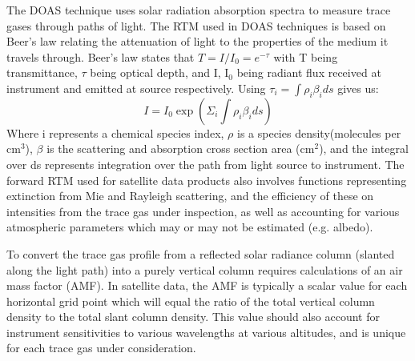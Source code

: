     The DOAS technique uses solar radiation absorption spectra to measure trace gases through paths of light.
    The RTM used in DOAS techniques is based on Beer's law relating the attenuation of light to the properties of the medium it travels through.
    Beer's law states that $ T = I/I_0 = e^{-\tau} $ with T being transmittance, $\tau$ being optical depth, and I, I$_0$ being radiant flux received at instrument and emitted at source respectively.
    Using 
    $ \tau_i = \int \rho_i \beta_i ds $ gives us:
    $$ I = I_0 \exp {\left( \Sigma_i \int \rho_i \beta_i ds \right) } $$
    Where i represents a chemical species index, $\rho$ is a species density(molecules per cm$^3$), $\beta$ is the scattering and absorption cross section area (cm$^2$), and the integral over ds represents integration over the path from light source to instrument.
    The forward RTM used for satellite data products also involves functions representing extinction from Mie and Rayleigh scattering, and the efficiency of these on intensities from the trace gas under inspection, as well as accounting for various atmospheric parameters which may or may not be estimated (e.g. albedo).
    
    To convert the trace gas profile from a reflected solar radiance column (slanted along the light path) into a purely vertical column requires calculations of an air mass factor (AMF).
    In satellite data, the AMF is typically a scalar value for each horizontal grid point which will equal the ratio of the total vertical column density to the total slant column density. This value should also account for instrument sensitivities to various wavelengths at various altitudes, and is unique for each trace gas under consideration.
  